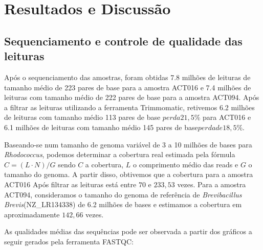 \chapter{Resultados e Discussão}\label{cap:resultados}

\section{Sequenciamento e controle de qualidade das leituras}
Após o sequenciamento das amostras, foram obtidas 7.8 milhões de leituras de tamanho médio de 
223 pares de base para a amostra ACT016 e 7.4 milhões de leituras com tamanho médio de 222 pares de base
para a amostra ACT094. Após a filtrar as leituras utilizando a ferramenta Trimmomatic, retivemos
6.2 milhões de leituras com tamanho médio 113 pares de base \(perda 21,5\%\) para ACT016 e 6.1 milhões
de leituras com tamanho médio 145 pares de base\(perda de 18,5\%\).

Baseando-se num tamanho de genoma variável de 3 a 10 milhões de bases para \textit{Rhodococcus}, podemos
determinar a cobertura real estimada pela fórmula $C= (L\cdot N)/G $ sendo $C$ a cobertura, $L$ o comprimento
médio das reads e $G$ o tamanho do genoma. A partir disso, obtivemos que a cobertura para a amostra ACT016 Após
filtrar as leituras está entre $70$ e $233,53$ vezes. 
Para a amostra ACT094, consideramos o tamanho do genoma de referência de \textit{Brevibacillus Brevis}(NZ\_LR134338) 
de 6.2 milhões de bases e estimamos a cobertura em aproximadamente $142,66$ vezes.

As qualidades médias das sequências pode ser observada a partir dos gráficos a seguir gerados pela ferramenta FASTQC:

